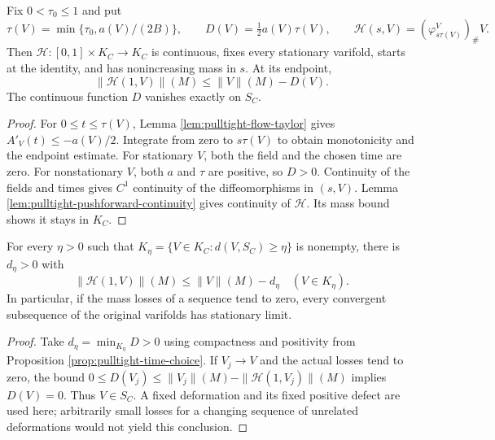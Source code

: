 \begin{proposition}\label{prop:pulltight-time-choice}
Fix $0<\tau_0\leq1$ and put
\[
 \tau(V)=\min\{\tau_0,a(V)/(2B)\},\qquad
 D(V)=\tfrac12 a(V)\tau(V),\qquad
 \mathscr H(s,V)=(\varphi_{s\tau(V)}^V)_\#V.
\]
Then $\mathscr H:[0,1]\times K_C\to K_C$ is continuous, fixes every stationary varifold, starts at the identity, and has nonincreasing mass in $s$. At its endpoint,
\[
 \|\mathscr H(1,V)\|(M)\leq\|V\|(M)-D(V).
\]
The continuous function $D$ vanishes exactly on $S_C$.
\end{proposition}
\begin{proof}
For $0\leq t\leq\tau(V)$, Lemma \ref{lem:pulltight-flow-taylor} gives $A'_V(t)\leq-a(V)/2$. Integrate from zero to $s\tau(V)$ to obtain monotonicity and the endpoint estimate. For stationary $V$, both the field and the chosen time are zero. For nonstationary $V$, both $a$ and $\tau$ are positive, so $D>0$. Continuity of the fields and times gives $C^1$ continuity of the diffeomorphisms in $(s,V)$. Lemma \ref{lem:pulltight-pushforward-continuity} gives continuity of $\mathscr H$. Its mass bound shows it stays in $K_C$.
\end{proof}

\begin{corollary}\label{cor:pulltight-uniform-loss}
For every $\eta>0$ such that $K_\eta=\{V\in K_C:d(V,S_C)\geq\eta\}$ is nonempty, there is $d_\eta>0$ with
\[
 \|\mathscr H(1,V)\|(M)\leq\|V\|(M)-d_\eta\quad(V\in K_\eta).
\]
In particular, if the mass losses of a sequence tend to zero, every convergent subsequence of the original varifolds has stationary limit.
\end{corollary}
\begin{proof}
Take $d_\eta=\min_{K_\eta}D>0$ using compactness and positivity from Proposition \ref{prop:pulltight-time-choice}. If $V_j\to V$ and the actual losses tend to zero, the bound $0\leq D(V_j)\leq\|V_j\|(M)-\|\mathscr H(1,V_j)\|(M)$ implies $D(V)=0$. Thus $V\in S_C$. A fixed deformation and its fixed positive defect are used here; arbitrarily small losses for a changing sequence of unrelated deformations would not yield this conclusion.
\end{proof}

